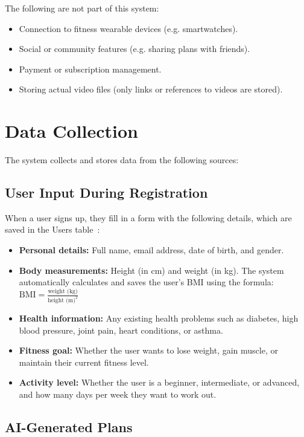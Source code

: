 \documentclass[12pt,a4paper]{article}
\begin{document}
The following are not part of this system:

\begin{itemize}[leftmargin=*]
  \item Connection to fitness wearable devices (e.g. smartwatches).
  \item Social or community features (e.g. sharing plans with friends).
  \item Payment or subscription management.
  \item Storing actual video files (only links or references to videos are stored).
\end{itemize}

\section{Data Collection}

The system collects and stores data from the following sources:

\subsection{User Input During Registration}

When a user signs up, they fill in a form with the following details, which are saved in the
Users table~\cite{srs}:

\begin{itemize}[leftmargin=*]
  \item \textbf{Personal details:} Full name, email address, date of birth, and gender.
  \item \textbf{Body measurements:} Height (in cm) and weight (in kg). The system
  automatically calculates and saves the user's BMI using the formula:
  $\text{BMI} = \frac{\text{weight (kg)}}{\text{height (m)}^2}$
  \item \textbf{Health information:} Any existing health problems such as diabetes,
  high blood pressure, joint pain, heart conditions, or asthma.
  \item \textbf{Fitness goal:} Whether the user wants to lose weight, gain muscle,
  or maintain their current fitness level.
  \item \textbf{Activity level:} Whether the user is a beginner, intermediate, or
  advanced, and how many days per week they want to work out.
\end{itemize}

\subsection{AI-Generated Plans}
\end{document}
